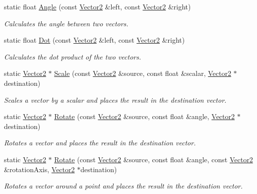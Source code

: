 \begin{DoxyCompactItemize}
static float \hyperlink{class_flounder_1_1_vector2_a0eedad869c44249f7660de3c0c0705c1}{Angle} (const \hyperlink{class_flounder_1_1_vector2}{Vector2} \&left, const \hyperlink{class_flounder_1_1_vector2}{Vector2} \&right)
\begin{DoxyCompactList}\small\item\em Calculates the angle between two vectors. \end{DoxyCompactList}\item 
static float \hyperlink{class_flounder_1_1_vector2_a1868f8c590856fe26747e7d208516234}{Dot} (const \hyperlink{class_flounder_1_1_vector2}{Vector2} \&left, const \hyperlink{class_flounder_1_1_vector2}{Vector2} \&right)
\begin{DoxyCompactList}\small\item\em Calculates the dot product of the two vectors. \end{DoxyCompactList}\item 
static \hyperlink{class_flounder_1_1_vector2}{Vector2} $\ast$ \hyperlink{class_flounder_1_1_vector2_aee3167fdec06c6a0714ac7c46dd5cb28}{Scale} (const \hyperlink{class_flounder_1_1_vector2}{Vector2} \&source, const float \&scalar, \hyperlink{class_flounder_1_1_vector2}{Vector2} $\ast$destination)
\begin{DoxyCompactList}\small\item\em Scales a vector by a scalar and places the result in the destination vector. \end{DoxyCompactList}\item 
static \hyperlink{class_flounder_1_1_vector2}{Vector2} $\ast$ \hyperlink{class_flounder_1_1_vector2_acffb40ef2b0127a1a1ed56d6d71df57b}{Rotate} (const \hyperlink{class_flounder_1_1_vector2}{Vector2} \&source, const float \&angle, \hyperlink{class_flounder_1_1_vector2}{Vector2} $\ast$destination)
\begin{DoxyCompactList}\small\item\em Rotates a vector and places the result in the destination vector. \end{DoxyCompactList}\item 
static \hyperlink{class_flounder_1_1_vector2}{Vector2} $\ast$ \hyperlink{class_flounder_1_1_vector2_aeb4d861430ddd186ef3d583e6c3ef7b7}{Rotate} (const \hyperlink{class_flounder_1_1_vector2}{Vector2} \&source, const float \&angle, const \hyperlink{class_flounder_1_1_vector2}{Vector2} \&rotation\+Axis, \hyperlink{class_flounder_1_1_vector2}{Vector2} $\ast$destination)
\begin{DoxyCompactList}\small\item\em Rotates a vector around a point and places the result in the destination vector. \end{DoxyCompactList}\item 

\end{DoxyCompactItemize}
